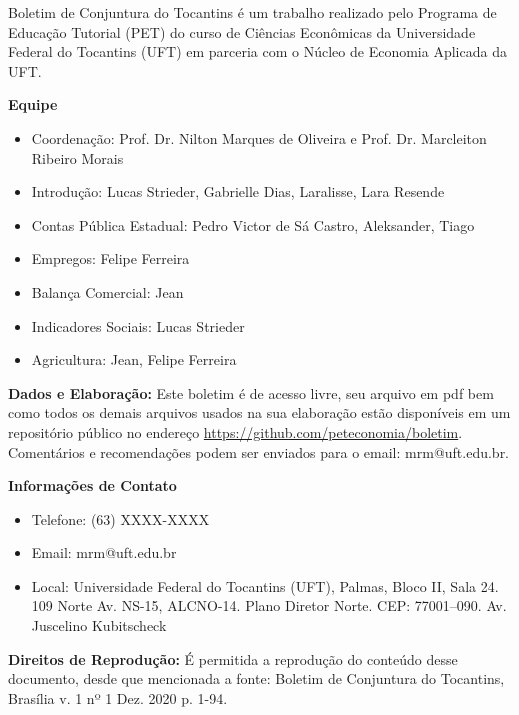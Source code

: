 \begin{tcolorbox}[colback=boxbackground, colframe=boxbackground, arc=0mm, top=15pt]
Boletim de Conjuntura do Tocantins é um trabalho realizado pelo Programa de Educação Tutorial (PET) do curso de Ciências Econômicas da Universidade Federal do Tocantins (UFT) em parceria com o Núcleo de Economia Aplicada da UFT.
\\
\par{\bf Equipe}
\begin{itemize}
	\item Coordenação: Prof. Dr. Nilton Marques de Oliveira e Prof. Dr. Marcleiton Ribeiro Morais
	\item Introdução: Lucas Strieder, Gabrielle Dias, Laralisse, Lara Resende
	\item Contas Pública Estadual: Pedro Victor de Sá Castro, Aleksander, Tiago
	\item Empregos: Felipe Ferreira
	\item Balança Comercial: Jean
	\item Indicadores Sociais: Lucas Strieder
	\item Agricultura: Jean, Felipe Ferreira
\end{itemize}
\par{\bf Dados e Elaboração:}
Este boletim é de acesso livre, seu arquivo em pdf bem como todos os demais arquivos usados na sua elaboração estão disponíveis em um repositório público no endereço \url{https://github.com/peteconomia/boletim}. Comentários e recomendações podem ser enviados para o email: mrm@uft.edu.br.
\\
\par{\bf Informações de Contato}
\begin{itemize}
	\item{Telefone:} (63) XXXX-XXXX
	\item{Email:} mrm@uft.edu.br
	\item{Local:} Universidade Federal do Tocantins (UFT), Palmas, Bloco II, Sala 24. 109 Norte Av. NS-15, ALCNO-14. Plano Diretor Norte. CEP: 77001--090. Av. Juscelino Kubitscheck
\end{itemize}
\par{\bf Direitos de Reprodução:}
É permitida a reprodução do conteúdo desse documento, desde que mencionada a fonte: Boletim de Conjuntura do Tocantins, Brasília v. 1 nº 1 Dez. 2020 p. 1-94.
\end{tcolorbox}


